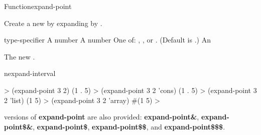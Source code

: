 \documentclass[10pt,twoside,english,pdftex]{article}
\begin{document}
\begin{functiondoc}{Function}{expand-point}%
  {
      
    \returns{} }
%
%

\fnsyntax

\fnpurpose Create a new  by expanding  by
.

\fnpackage {}

\fnmodule {}

\fnargs
\begin{args}{type-specifier}
\arg[point] A number
\arg[amount] A number
 One of: , , or .
  (Default is .)
 An 
\end{args}

\fnreturns The new .

\begin{alsos}{nexpand-interval}
\end{alsos}

\fnexamples
%
\W\supp
\begin{example}
  > (expand-point 3 2)
  (1 . 5)
  > (expand-point 3 2 'cons)
  (1 . 5)
  > (expand-point 3 2 'list)
  (1 5)
  > (expand-point 3 2 'array)
  #(1 5)
  >
\end{example}

\fnnote
%
%
%
%
%
%
%
 versions of
\textbf{expand-point} are also provided: \textbf{expand-point\&},
\textbf{expand-point\$\&}, \textbf{expand-point\$},
\textbf{expand-point\$\$}, and \textbf{expand-point\$\$\$}.

\end{functiondoc}

\end{document}
